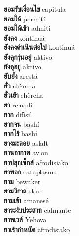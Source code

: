 \textbf{ ยอมรับเงื่อนไข  } capitula \\
\textbf{ ยอมให้  } permití \\
\textbf{ ยอมให้เข้า  } admiti \\
\textbf{ ยังคง  } kontinuá \\
\textbf{ ยังคงดำเนินต่อไป  } kontinuá \\
\textbf{ ยังคุกรุ่นอยู่  } aktivo \\
\textbf{ ยังคุอยู่  } aktivo \\
\textbf{ ยับยั้ง  } arestá \\
\textbf{ ยั่ว  } chèrcha \\
\textbf{ ยั่วเย้า  } chèrcha \\
\textbf{ ยา  } remedi \\
\textbf{ ยาก  } difísil \\
\textbf{ ยากจน  } bashí \\
\textbf{ ยากไร้  } bashí \\
\textbf{ ยางมะตอย  } asfalt \\
\textbf{ ยานอากาศ  } avion \\
\textbf{ ยาปลุกเซ็กส์  } afrodisiako \\
\textbf{ ยาพอก  } cataplasma \\
\textbf{ ยาม  } bewaker \\
\textbf{ ยามวิกาล  } skur \\
\textbf{ ยามเช้า  } amanesé \\
\textbf{ ยาระงับประสาท  } calmante \\
\textbf{ ยาหเวห์  } Yehova \\
\textbf{ ยาเร้ากำหนัด  } afrodisiako \\
